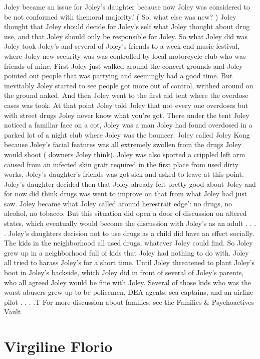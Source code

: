 \documentclass[12pt]{book}
\begin{document}
Joley became an issue for Joley's daughter because now Joley was considered to be not conformed with themoral majority.' (  So, what else was new? ) Joley thought that Joley should decide for Joley's self what Joley thought about drug use, and that Joley should only be responsible for Joley. So what Joley did was Joley took Joley's and several of Joley's friends to a week end music festival, where Joley new security was was controlled by local motorcycle club who was friends of mine. First Joley just walked around the concert grounds and Joley pointed out people that was partying and seemingly had a good time. But inevitably Joley started to see people got more out of control, writhed around on the ground naked. And then Joley went to the first aid tent where the overdose cases was took. At that point Joley told Joley that not every one overdoses but with street drugs Joley never know what you're got. There under the tent Joley noticed a familiar face on a cot, Joley was a man Joley had found overdosed in a parked lot of a night club where Joley was the bouncer. Joley called Joley Kong because Joley's facial features was all extremely swollen from the drugs Joley would shoot ( downers Joley think). Joley was also sported a crippled left arm caused from an infected skin graft required in the first place from used dirty works. Joley's daughter's friends was got sick and asked to leave at this point. Joley's daughter decided then that Joley already felt pretty good about Joley and for now did think drugs was went to improve on that from what Joley had just saw. Joley became what Joley called around herestrait edge': no drugs, no alcohol, no tobacco. But this situation did open a door of discussion on altered states, which eventually would become the discussion with Joley's as an adult . . .  . Joley's daughters decision not to use drugs as a child did have an effect socially. The kids in the neighborhood all used drugs, whatever Joley could find. So Joley grew up in a neighborhood full of kids that Joley had nothing to do with. Joley all tried to harass Joley's for a short time. Until Joley threatened to plant Joley's boot in Joley's backside, which Joley did in front of several of Joley's parents, who all agreed Joley would be fine with Joley. Several of those kids who was the worst abusers grew up to be policemen, DEA agents, sea captains, and an airline pilot . . .  .T For more discussion about families, see the Families \& Psychoactives Vault



\chapter{Virgiline Florio}
\end{document}
